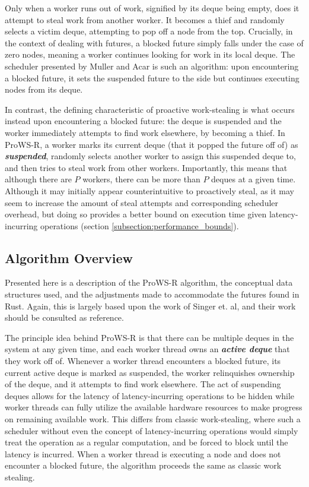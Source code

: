 \documentclass[bsc,frontabs,singlespacing,parskip,deptreport,normalheadings]{infthesis}
\begin{document}
Only when a worker runs out of work, signified by its deque being empty, does it
attempt to steal work from another worker. It becomes a thief and randomly
selects a victim deque, attempting to pop off a node from the top. Crucially, in
the context of dealing with futures, a blocked future simply falls under the
case of zero nodes, meaning a worker continues looking for work in its local
deque. The scheduler presented by Muller and Acar
\cite{muller_latency-hiding_2016} is such an algorithm: upon encountering a
blocked future, it sets the suspended future to the side but continues executing
nodes from its deque.

In contrast, the defining characteristic of proactive work-stealing is what
occurs instead upon encountering a blocked future: the deque is suspended and
the worker immediately attempts to find work elsewhere, by becoming a thief. In
ProWS-R, a worker marks its current deque (that it popped the future off of) as
\textbf{\textit{suspended}}, randomly selects another worker to assign this
suspended deque to, and then tries to steal work from other workers.
Importantly, this means that although there are \(P\) workers, there can be more
than \(P\) deques at a given time. Although it may initially appear
counterintuitive to proactively steal, as it may seem to increase the amount of
steal attempts and corresponding scheduler overhead, but doing so provides a
better bound on execution time given latency-incurring operations (section
\ref{subsection:performance_bounds}).

\subsection{Algorithm Overview}
\label{subsection:the_algorithm_in_detail}

Presented here is a description of the ProWS-R algorithm, the conceptual data
structures used, and the adjustments made to accommodate the futures found in
Rust. Again, this is largely based upon the work of Singer et. al, and their
work should be consulted as reference.

The principle idea behind ProWS-R is that there can be multiple deques in the
system at any given time, and each worker thread owns an \textbf{\textit{active
deque}} that they work off of. Whenever a worker thread encounters a blocked
future, its current active deque is marked as suspended, the worker relinquishes
ownership of the deque, and it attempts to find work elsewhere. The act of
suspending deques allows for the latency of latency-incurring operations to be
hidden while worker threads can fully utilize the available hardware resources
to make progress on remaining available work. This differs from classic
work-stealing, where such a scheduler without even the concept of
latency-incurring operations would simply treat the operation as a regular
computation, and be forced to block until the latency is incurred. When a worker
thread is executing a node and does not encounter a blocked future, the
algorithm proceeds the same as classic work stealing.
\end{document}
